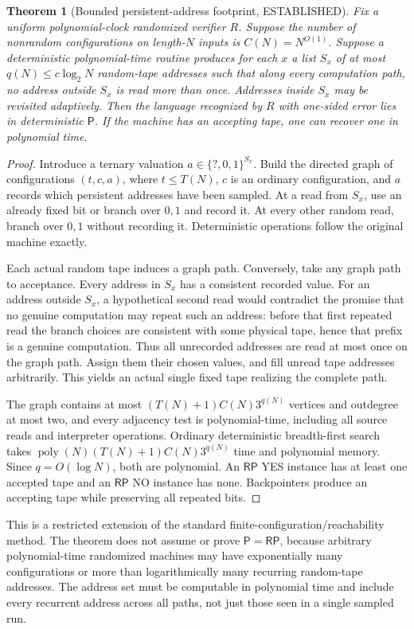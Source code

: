 \documentclass[11pt]{article}
\newtheorem{theorem}{Theorem}
\newcommand{\RP}{\mathsf{RP}}
\newcommand{\PP}{\mathsf{P}}
\newcommand{\poly}{\operatorname{poly}}
\begin{document}
\begin{theorem}[Bounded persistent-address footprint, ESTABLISHED]
Fix a uniform polynomial-clock randomized verifier $R$. Suppose the number of nonrandom configurations on length-$N$ inputs is $C(N)=N^{O(1)}$. Suppose a deterministic polynomial-time routine produces for each $x$ a list $S_x$ of at most $q(N)\le c\log_2 N$ random-tape addresses such that along every computation path, no address outside $S_x$ is read more than once. Addresses inside $S_x$ may be revisited adaptively. Then the language recognized by $R$ with one-sided error lies in deterministic $\PP$. If the machine has an accepting tape, one can recover one in polynomial time.
\end{theorem}
\begin{proof}
Introduce a ternary valuation $a\in\{?,0,1\}^{S_x}$. Build the directed graph of configurations $(t,c,a)$, where $t\le T(N)$, $c$ is an ordinary configuration, and $a$ records which persistent addresses have been sampled. At a read from $S_x$, use an already fixed bit or branch over $0,1$ and record it. At every other random read, branch over $0,1$ without recording it. Deterministic operations follow the original machine exactly.

Each actual random tape induces a graph path. Conversely, take any graph path to acceptance. Every address in $S_x$ has a consistent recorded value. For an address outside $S_x$, a hypothetical second read would contradict the promise that no genuine computation may repeat such an address: before that first repeated read the branch choices are consistent with some physical tape, hence that prefix is a genuine computation. Thus all unrecorded addresses are read at most once on the graph path. Assign them their chosen values, and fill unread tape addresses arbitrarily. This yields an actual single fixed tape realizing the complete path.

The graph contains at most $(T(N)+1)C(N)3^{q(N)}$ vertices and outdegree at most two, and every adjacency test is polynomial-time, including all source reads and interpreter operations. Ordinary deterministic breadth-first search takes $\poly(N)(T(N)+1)C(N)3^{q(N)}$ time and polynomial memory. Since $q=O(\log N)$, both are polynomial. An $\RP$ YES instance has at least one accepted tape and an $\RP$ NO instance has none. Backpointers produce an accepting tape while preserving all repeated bits.
\end{proof}

\noindent This is a restricted extension of the standard finite-configuration/reachability method. The theorem does not assume or prove $\PP=\RP$, because arbitrary polynomial-time randomized machines may have exponentially many configurations or more than logarithmically many recurring random-tape addresses. The address set must be computable in polynomial time and include every recurrent address across all paths, not just those seen in a single sampled run.
\end{document}
